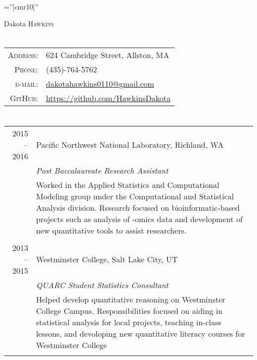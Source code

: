 \documentclass[a4paper,10pt]{article}
\begin{document}
\pagestyle{empty} %

\font\fb=''[cmr10]'' %

\par{\centering
		{\Huge Dakota \textsc{Hawkins}
	}\bigskip\par}

\section{\color{linkcolour}{Contact}}

\begin{tabular}{rl}
    \textsc{Address:} & 624 Cambridge Street, Allston, MA \\
    \textsc{Phone:}   & (435)-764-5762 \\
    \textsc{e-mail:}  & \href{mailto:dakotahawkins0110@gmail.com}{dakotahawkins0110@gmail.com} \\
    \textsc{GitHub:}  & \href{https://github.com/HawkinsDakota}{https://github.com/HawkinsDakota}
\end{tabular}

\section{\color{linkcolour}{Work Experience}}
\begin{tabular}{r|p{11cm}}
 \textsc{2015 -- 2016}     & Pacific Northwest National Laboratory, Richland, WA \\
  	& \emph{Post Baccalaureate Research Assistant} \\
                    & \footnotesize{Worked in the Applied Statistics and Computational Modeling group under the Computational and Statistical Analysis division. Research focused on bioinformatic-based projects such as analysis of -omics data and development of new quantitative tools to assist researchers.}\\
\multicolumn{2}{c}{} \\

\textsc{2013 -- 2015} & Westminster College, Salt Lake City, UT \\
 & \emph{QUARC Student Statistics Consultant}\\
 & \footnotesize{Helped develop quantitative reasoning on Westminster College Campus. Responsibilities focused on aiding in statistical analysis for local projects, teaching in-class lessons, and devoloping new quantitative literacy courses for Westminster College}\\\multicolumn{2}{c}{} \\
\end{tabular}
\end{document}
